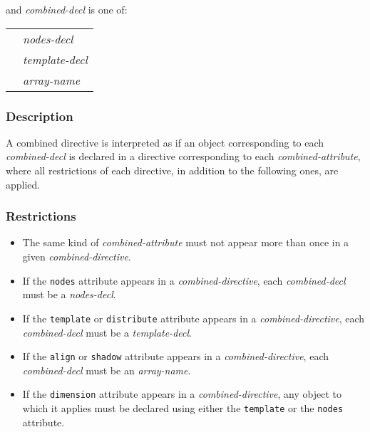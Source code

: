 \vspace{0.3cm}

and {\it combined-decl} is one of:

\vspace{0.3cm}

\begin{tabular}{ll}
 \hspace{0.5cm} & {\it nodes-decl} \\
 & {\it template-decl} \\
 & {\it array-name}
\end{tabular}

\subsubsection*{Description}

A combined directive is interpreted as if an object corresponding to
each {\it combined-decl} is declared in a directive corresponding to
each {\it combined-attribute}, where all restrictions of each directive,
in addition to the following ones, are applied.

\subsubsection*{Restrictions}

\begin{itemize}
 \item The same kind of {\it combined-attribute} must not appear more
       than once in a given {\it combined-directive}.
 \item If the {\tt nodes} attribute appears in a {\it
       combined-directive}, each {\it combined-decl} must be a {\it
       nodes-decl}.
 \item If the {\tt template} or {\tt distribute} attribute appears in a
       {\it combined-directive}, each {\it combined-decl} must be a {\it
       template-decl}.
 \item If the {\tt align} or {\tt shadow} attribute appears in a
       {\it combined-directive}, each {\it combined-decl} must be an
       {\it array-name}.
 \item If the {\tt dimension} attribute appears in a {\it
       combined-directive}, any object to which it applies must be
       declared using either the {\tt template} or the {\tt nodes}
       attribute.
\end{itemize}

